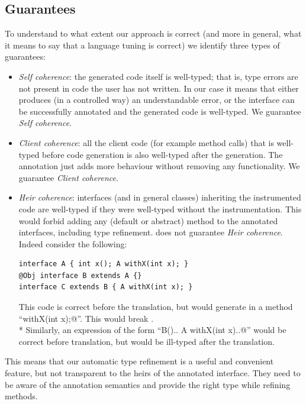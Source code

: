 


\subsection{Guarantees}
To understand to what extent our approach is correct (and more in general, what it means to say that a language tuning is correct) we identify three types of guarantees:
\begin{itemize}
\item \textit{Self coherence}: the generated code itself is well-typed; that is,
  type errors are not present in code the user has not written.
In our case it means that either \mixin{} produces (in a controlled way) an
understandable error, or the interface can be successfully annotated and the generated code is well-typed.
We guarantee \textit{Self coherence}.

\item \textit{Client coherence}: all the client code (for example method calls)
  that is well-typed before code generation is also well-typed after the generation.
The annotation just adds more behaviour without removing any functionality.
We guarantee \textit{Client coherence}.

\item \textit{Heir coherence}: interfaces (and in general classes) inheriting the instrumented code are well-typed if they were well-typed without the instrumentation.
This would forbid adding any (default or abstract) method to the annotated interfaces, including type refinement.
\mixin  does not guarantee \textit{Heir coherence}.
Indeed consider the following:

\begin{lstlisting}
interface A { int x(); A withX(int x); }
@Obj interface B extends A {}
interface C extends B { A withX(int x); }
\end{lstlisting}

\noindent This code is correct before the translation, but \mixin would  generate in \Q@B@  a method ``\Q@B withX(int x);@''.
This would break \Q@C@. \\*
Similarly, an expression of the form ``\Q@new B(){.. A withX(int x){..}}@''
would be correct before translation, but would be ill-typed after the translation.
\end{itemize}

\noindent This means that our automatic type refinement
is a useful and convenient feature, but not transparent to the heirs of the annotated interface. They need to be aware of the annotation semantics and provide the right type while refining methods.


